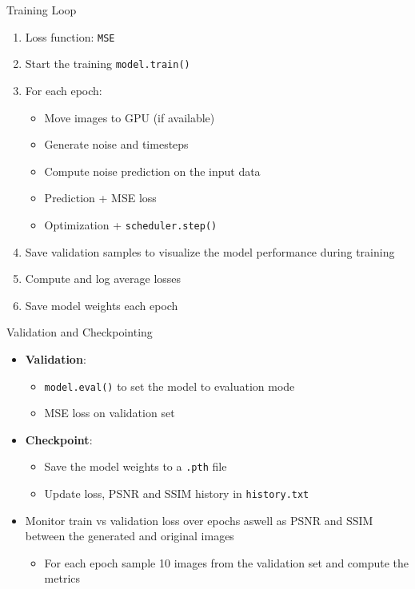 \begin{frame}{Training Loop}
    \begin{enumerate}
        \item Loss function: \texttt{MSE}
        \item Start the training \texttt{model.train()}
        \item For each epoch:
              \begin{itemize}
                  \item Move images to GPU (if available)
                  \item Generate noise and timesteps
                  \item Compute noise prediction on the input data
                  \item Prediction + MSE loss
                  \item Optimization + \texttt{scheduler.step()}
              \end{itemize}
        \item Save validation samples to visualize the model performance during training
        \item Compute and log average losses
        \item Save model weights each epoch
    \end{enumerate}
\end{frame}

\begin{frame}{Validation and Checkpointing}
    \begin{itemize}
        \item \textbf{Validation}:
              \begin{itemize}
                  \item \texttt{model.eval()} to set the model to evaluation mode
                  \item MSE loss on validation set
              \end{itemize}
        \item \textbf{Checkpoint}:
              \begin{itemize}
                  \item Save the model weights to a \texttt{.pth} file
                  \item Update loss, PSNR and SSIM history in \texttt{history.txt}
              \end{itemize}
        \item Monitor train vs validation loss over epochs aswell as PSNR and SSIM between the generated and original images
                \begin{itemize}
                    \item For each epoch sample 10 images from the validation set and compute the metrics
                \end{itemize}
    \end{itemize}
\end{frame}

